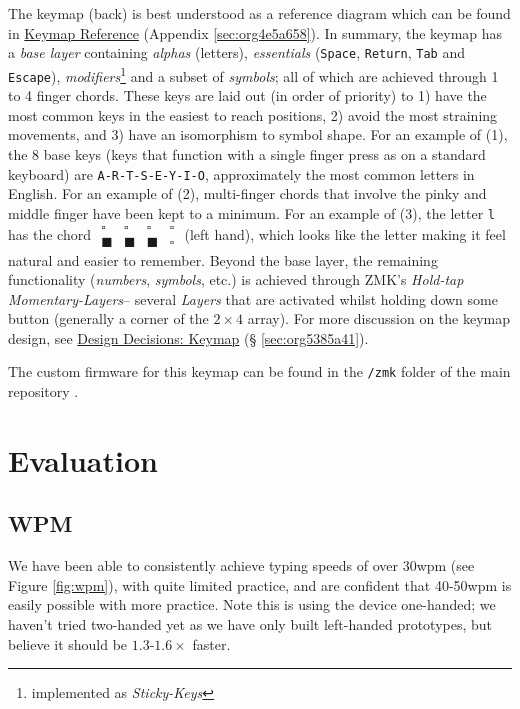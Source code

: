 \documentclass[logo,bsc,singlespacing,parskip]{infthesis}
\begin{document}
The keymap (back) is best understood as a reference diagram which can be found in
\hyperref[sec:org4e5a658]{Keymap Reference} (Appendix \ref{sec:org4e5a658}).
In summary, the keymap has a \emph{base layer} containing \emph{alphas} (letters), \emph{essentials} (\texttt{Space}, \texttt{Return}, \texttt{Tab} and \texttt{Escape}), \emph{modifiers}\footnote{implemented as \emph{Sticky-Keys}} and a subset of \emph{symbols}; all of which are achieved through 1 to 4 finger chords.
These keys are laid out (in order of priority) to 1) have the most common keys in the easiest to reach positions, 2) avoid the most straining movements, and 3) have an isomorphism to symbol shape.
For an example of (1), the 8 base keys (keys that function with a single finger press as on a standard keyboard) are  \texttt{A-R-T-S-E-Y-I-O}, approximately the most common letters in English.
For an example of (2), multi-finger chords that involve the pinky and middle finger have been kept to a minimum.
For an example of (3), the letter \texttt{l} has the chord \(\begin{matrix} \square & \square  & \square  & \square \\ \blacksquare &  \blacksquare & \blacksquare & \square \end{matrix}\) (left hand), which looks like the letter making it feel natural and easier to remember.
Beyond the base layer, the remaining functionality (\emph{numbers}, \emph{symbols}, etc.) is achieved through ZMK's \autocite{ZMKFirmware}  \emph{Hold-tap} \emph{Momentary-Layers}-- several \emph{Layers} that are activated whilst holding down some button (generally a corner of the \(2\times4\) array).
For more discussion on the keymap design, see \hyperref[sec:org5385a41]{Design Decisions: Keymap} (§ \ref{sec:org5385a41}).

The custom firmware for this keymap can be found in the \texttt{/zmk} folder of the main repository \autocite{sharpNazzacodeHCIDMy}.
\section{Evaluation}
\label{sec:org11c05f5}
\subsection{WPM}
\label{sec:org61723c3}
We have been able to consistently achieve typing speeds of over 30wpm (see Figure \ref{fig:wpm}), with quite limited practice, and are confident that 40-50wpm is easily possible with more practice.
Note this is using the device one-handed; we haven't tried two-handed yet as we have only built left-handed prototypes, but believe it should be \(1.3\)-\(1.6\times\) faster.
\end{document}

